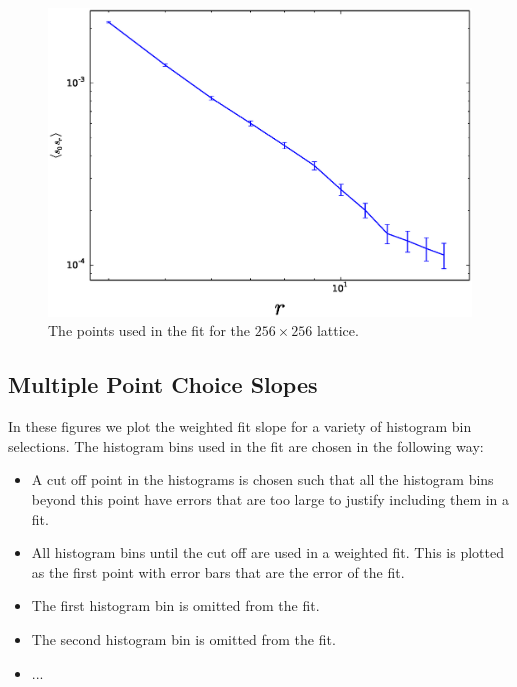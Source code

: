 \documentclass[aps,floatfix,11pt]{revtex4-1}
\begin{document}
\begin{figure}[h]
    \centering
    \includegraphics[width=8.5 cm]{fit_dm_dm_horz_ln_pnts_256x256}
    \caption{The points used in the fit for the $256\times256$ lattice.\label{fig:fit_dm_dm_256x256}}
\end{figure}

\subsection{Multiple Point Choice Slopes}
In these figures %
we plot the weighted fit slope for a variety of histogram bin selections. The
histogram bins used in the fit are chosen in the following way:

\begin{itemize}
    \item A cut off point in the histograms is chosen such that all the histogram bins beyond this
        point have errors that are too large to justify including them in a fit.
    \item All histogram bins until the cut off are used in a weighted fit. This is plotted as the first
        point with error bars that are the error of the fit.
    \item The first histogram bin is omitted from the fit.
    \item The second histogram bin is omitted from the fit.
    \item ...
\end{itemize}
\end{document}
